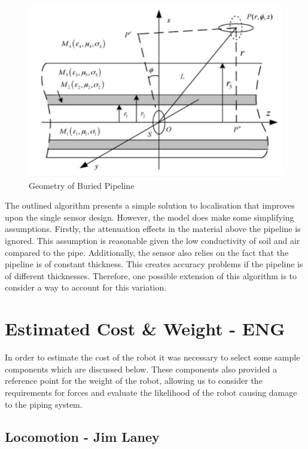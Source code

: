 \documentclass[11pt]{article}		%
\begin{document}
			\begin{figure}[h]
				\centering
				\includegraphics[scale=1]{localisation.pdf}
				\caption{Geometry of Buried Pipeline}
				\label{localisation}
			\end{figure}
			
			The outlined algorithm presents a simple solution to localisation that improves upon the single sensor design. However, the model does make some simplifying assumptions. Firstly, the attenuation effects in the material above the pipeline is ignored. This assumption is reasonable given the low conductivity of soil and air compared to the pipe. Additionally, the sensor also relies on the fact that the pipeline is of constant thickness. This creates accuracy problems if the pipeline is of different thicknesses. Therefore, one possible extension of this algorithm is to consider a way to account for this variation. 

	\section{Estimated Cost \& Weight - ENG}
		
		In order to estimate the cost of the robot it was necessary to select some sample components which are discussed below.
		These components also provided a reference point for the weight of the robot, allowing us to consider the requirements for forces and evaluate the likelihood of the robot causing damage to the piping system.
		
		\subsection[Locomotion]{Locomotion - Jim Laney}
		
\end{document}
